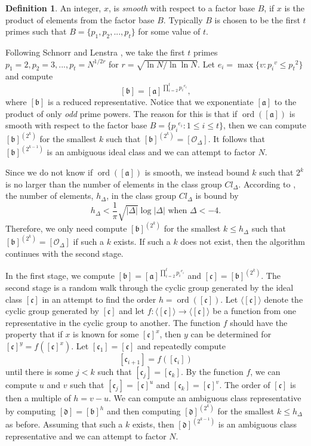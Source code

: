 \documentclass{ucalgthes1}
\theoremstyle{definition}
\newtheorem{defn}[thm]{Definition}
\DeclareMathOperator{\ord}{ord}
\newcommand{\aclass}{[\mathfrak a]}
\newcommand{\bclass}{[\mathfrak b]}
\newcommand{\cclass}{[\mathfrak c]}
\newcommand{\dclass}{[\mathfrak d]}
\newcommand{\idclass}{[\mathcal O_\Delta]}
\begin{document}
\begin{defn}
An integer, $x$, is \emph{smooth} with respect to a factor base $B$, if $x$ is the product of elements from the factor base $B$.  Typically $B$ is chosen to be the first $t$ primes such that $B = \{p_1, p_2, ..., p_t\}$ for some value of $t$.
\end{defn}

Following Schnorr and Lenstra \cite{Schnorr1984}, we take the first $t$ primes $p_1 = 2, p_2 = 3, ..., p_t = N^{1/2r}$ for $r = \sqrt{\ln N / \ln \ln N}$.  Let $e_i = \max \{ v : {p_i}^v \le {p_t}^2 \}$ and compute
\[
	\bclass = \aclass^{\prod_{i=2}^t {p_i}^{e_i}},
\]
where $\bclass$ is a reduced representative. Notice that we exponentiate $\aclass$ to the product of only \emph{odd} prime powers.  The reason for this is that if $\ord(\aclass)$ is smooth with respect to the factor base $B = \{{p_i}^{e_i} : 1 \le i \le t\}$, then we can compute $\bclass^{\left(2^k\right)}$ for the smallest $k$ such that $\bclass^{\left(2^k\right)} = \idclass$.  It follows that $\bclass^{\left(2^{k-1}\right)}$ is an ambiguous ideal class and we can attempt to factor $N$.

Since we do not know if $\ord(\aclass)$ is smooth, we instead bound $k$ such that $2^k$ is no larger than the number of elements in the class group $Cl_\Delta$.  According to \cite[p.155]{Jacobson2009}, the number of elements, $h_\Delta$, in the class group $Cl_\Delta$ is bound by
\[
	h_\Delta < \frac{1}{\pi} \sqrt{|\Delta|}\log{|\Delta|} \textrm{ when } \Delta < -4.
\]
Therefore, we only need compute $\bclass^{\left(2^k\right)}$ for the smallest $k \le h_\Delta$ such that $\bclass^{\left(2^k\right)} = \idclass$ if such a $k$ exists. If such a $k$ does not exist, then the algorithm continues with the second stage.

In the first stage, we compute $\bclass = \aclass^{\prod_{i=2}^t {p_i}^{e_i}}$ and $\cclass = \bclass^{\left(2^k\right)}$.  The second stage is a random walk through the cyclic group generated by the ideal class $\cclass$ in an attempt to find the order $h = \ord(\cclass)$.  Let $\langle \cclass \rangle$ denote the cyclic group generated by $\cclass$ and let $f : \langle \cclass \rangle \rightarrow \langle \cclass \rangle$ be a function from one representative in the cyclic group to another.  The function $f$ should have the property that if $x$ is known for some $\cclass ^x$, then $y$ can be determined for $\cclass^y = f(\cclass^x)$.  Let $[\mathfrak c_1] = \cclass$ and repeatedly compute
\[
	[\mathfrak c_{i+1}] = f([\mathfrak c_i])
\]
until there is some $j < k$ such that $[\mathfrak c_j] = [\mathfrak c_k]$.  By the function $f$, we can compute $u$ and $v$ such that $[\mathfrak c_j]=\cclass^u$ and $[\mathfrak c_k]=\cclass^v$.  The order of $\cclass$ is then a multiple of $h = v - u$.  We can compute an ambiguous class representative by computing $\dclass = \bclass^h$ and then computing $\dclass^{\left(2^k\right)}$ for the smallest $k \le h_\Delta$ as before.  Assuming that such a $k$ exists, then $\dclass^{\left(2^{k-1}\right)}$ is an ambiguous class representative and we can attempt to factor $N$.
\end{document}
